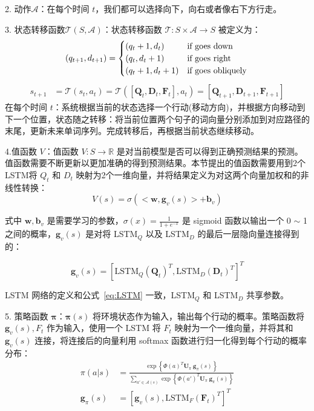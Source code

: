 2. 动作$\mathcal{A}$：在每个时间 $t$，我们都可以选择向下，向右或者像右下方行走。

3. 状态转移函数$\mathcal{T}(S,\mathcal{A})$：状态转移函数 $\mathcal{T}:S\times \mathcal{A}\rightarrow S$ 被定义为：
$$
(q_{t+1}, d_{t+1}) =
\begin{cases}
(q_{t} + 1, d_{t}) &\text{if goes down} \\
(q_{t}, d_{t} + 1) &\text{if goes right}  \\
(q_{t} + 1, d_{t} + 1) &\text{if goes obliquely}
\end{cases} \\
$$
$$
\begin{aligned}
s_{t+1} &= \mathcal{T}(s_t, a_t) = \mathcal{T}([\mathbf{Q}_t, \mathbf{D}_t, \mathbf{F}_t], a_t) = [\mathbf{Q}_{t+1}, \mathbf{D}_{t+1},\mathbf{F}_{t+1}]
\end{aligned}
$$
在每个时间 $t$：系统根据当前的状态选择一个行动(移动方向)，并根据方向移动到下一个位置，状态随之转移：将当前位置两个句子的词向量分别添加到对应路径的末尾，更新未来单词序列。完成转移后，再根据当前状态继续移动。

4.值函数 $V$：值函数 $V: S\rightarrow \mathbb{R}$ 是对当前模型是否可以得到正确预测结果的预测。值函数需要不断更新以更加准确的得到预测结果。本节提出的值函数需要用到2个LSTM将 $Q_t$ 和 $D_t$ 映射为2个一维向量，并将结果定义为对这两个向量加权和的非线性转换：
\begin{equation}
\label{eq:MCTS_value}
V(s) = \sigma (<\mathbf{w}, \mathbf{g}_v(s)> + \mathbf{b}_v)
\end{equation}

式中 $\mathbf{w}, \mathbf{b}_v$ 是需要学习的参数，$
\sigma(x) = \frac{1}{1+e^{-x}}$ 是 sigmoid 函数以输出一个 0 $\sim$ 1 之间的概率，$\mathbf{g}_v(s)$ 是对将 LSTM$_Q$ 以及 LSTM$_D$ 的最后一层隐向量连接得到的：

\begin{equation}
\mathbf{g}_v(s) = [\mathrm{LSTM}_Q(\mathbf{Q}_t)^T, \mathrm{LSTM}_D(\mathbf{D}_{t})^T]^T
\end{equation}

LSTM 网络的定义和公式~\ref{eq:LSTM} 一致，LSTM$_Q$ 和 LSTM$_D$ 共享参数。

5. 策略函数 $\mathbf{\pi}$：$\mathbf{\pi}(s)$ 将环境状态作为输入，输出每个行动的概率。策略函数将 $\mathbf{g}_v(s), F_t$ 作为输入，使用一个 LSTM 将 $F_t$ 映射为一个一维向量，并将其和 $\mathbf{g}_v(s)$ 连接，将连接后的向量利用 softmax 函数进行归一化得到每个行动的概率分布：
\begin{equation}
\label{eq:MCTS_policy}
\begin{aligned}
\pi(a|s) &= \frac{\exp\left\{\Phi(a)^T \mathbf{U}_\pi ~\mathbf{g}_\pi(s)\right\}}{\sum_{a'\in\mathcal{A}(s)} \exp\left\{\Phi(a')^T \mathbf{U}_\pi ~\mathbf{g}_\pi(s)\right\}} \\
\mathbf{g}_\pi(s) &= [\mathbf{g}_v(s) , \mathrm{LSTM}_F(\mathbf{F}_{t})^T]^T
\end{aligned}
\end{equation}

